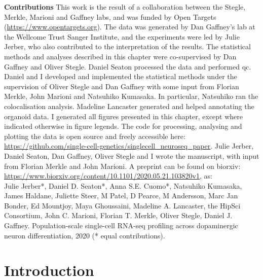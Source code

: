 \newpage

\begin{Comment2}

\hspace{-3mm}\textbf{Contributions} This work is the result of a collaboration between the Stegle, Merkle, Marioni and Gaffney labs, and was funded by Open Targets 
(\url{https://www.opentargets.org}).
The data was generated by Dan Gaffney’s lab at the Wellcome Trust Sanger Institute, and the experiments were led by Julie Jerber, who also contributed to the interpretation of the results. 
The statistical methods and analyses described in this chapter were co-supervised by Dan Gaffney and Oliver Stegle. 
Daniel Seaton processed the data and performed \gls{qc}. 
Daniel and I developed and implemented the statistical methods under the supervision of Oliver Stegle and Dan Gaffney with some input from Florian Merkle, John Marioni and Natsuhiko Kumasaka.
In particular, Natsuhiko ran the colocalisation analysis.
Madeline Lancaster generated and helped annotating the organoid data.
I generated all figures presented in this chapter, except where indicated otherwise in figure legends. 
The code for processing, analysing and plotting the data is open source and freely accessible here: \url{https://github.com/single-cell-genetics/singlecell\_neuroseq\_paper}.
Julie Jerber, Daniel Seaton, Dan Gaffney, Oliver Stegle and I wrote the manuscript, with input from Florian Merkle and John Marioni.
A preprint \cite{jerber2020population} can be found on biorxiv: \url{https://www.biorxiv.org/content/10.1101/2020.05.21.103820v1}, as:\\

Julie Jerber*, Daniel D. Seaton*, Anna S.E. Cuomo*, Natsuhiko Kumasaka, James Haldane, Juliette Steer, M Patel, D Pearce, M Andersson, Marc Jan Bonder, Ed Mountjoy, Maya Ghoussaini, Madeline A. Lancaster, the HipSci Consortium, John C. Marioni, Florian T. Merkle, Oliver Stegle, Daniel J. Gaffney. Population-scale single-cell RNA-seq profiling across dopaminergic neuron differentiation, 2020 (* equal contributions).

\end{Comment2}

\newpage

\section{Introduction}
\label{sec:neuroseq_intro}

